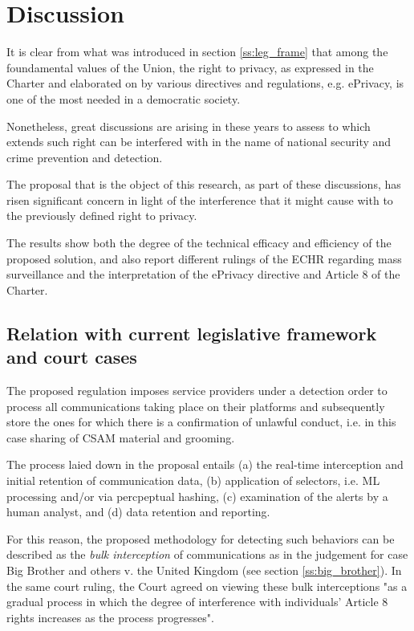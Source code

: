 \section{Discussion}
\label{s:disc}

It is clear from what was introduced in section \ref{ss:leg_frame} that among the foundamental values of the Union, the right to privacy, as expressed in the Charter and elaborated on by various directives and regulations, e.g. ePrivacy, is one of the most needed in a democratic society. 

Nonetheless, great discussions are arising in these years to assess to which extends such right can be interfered with in the name of national security and crime prevention and detection. 

The proposal that is the object of this research, as part of these discussions, has risen significant concern in light of the interference that it might cause with to the previously defined right to privacy.

The results show both the degree of the technical efficacy and efficiency of the proposed solution, and also report different rulings of the ECHR regarding mass surveillance and the interpretation of the ePrivacy directive and Article 8 of the Charter. 

\subsection{Relation with current legislative framework and court cases}
\label{ss:relation_leg}

The proposed regulation imposes service providers under a detection order to process all communications taking place on their platforms and subsequently store the ones for which there is a confirmation of unlawful conduct, i.e. in this case sharing of CSAM material and grooming.

The process laied down in the proposal entails (a) the real-time interception and initial retention of communication data, (b) application of selectors, i.e. ML processing and/or via percpeptual hashing, (c) examination of the alerts by a human analyst, and (d) data retention and reporting. 

For this reason, the proposed methodology for detecting such behaviors can be described as the \textit{bulk interception} of communications as in the judgement for case Big Brother and others v. the United Kingdom (see section \ref{ss:big_brother}). In the same court ruling, the Court agreed on viewing these bulk interceptions "as a gradual process in which the degree of interference with individuals' Article 8 rights increases as the process progresses"\cite{big_brother}.

